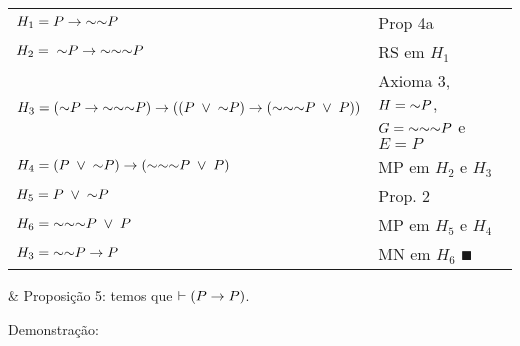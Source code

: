 \begin{tabular}{p{}p{}}
  \hline
    $H_1 = P \rightarrow \mathord{\sim}\mathord{\sim} P$                                  & Prop 4a \\
    $H_2 = \;\mathord{\sim} P \rightarrow \mathord{\sim}\mathord{\sim}\mathord{\sim} P$                       & RS em $H_1$ \\
    $H_3 = (\mathord{\sim} P \rightarrow \mathord{\sim}\mathord{\sim}\mathord{\sim} P) \rightarrow ( (P \;\lor\; \mathord{\sim} P) \rightarrow (\mathord{\sim}\mathord{\sim}\mathord{\sim} P \;\lor\; P) )$       & Axioma 3, $H = \mathord{\sim} P$, $G = \mathord{\sim}\mathord{\sim}\mathord{\sim} P$ e $E = P$ \\
    $H_4 = (P \;\lor\; \mathord{\sim} P) \rightarrow (\mathord{\sim}\mathord{\sim}\mathord{\sim} P \;\lor\; P)$         & MP em $H_2$ e $H_3$ \\
    $H_5 = P \;\lor\; \mathord{\sim} P$                                       & Prop. 2 \\
    $H_6 = \mathord{\sim}\mathord{\sim}\mathord{\sim} P \;\lor\; P$                               & MP em $H_5$ e $H_4$ \\
    $H_3 = \mathord{\sim}\mathord{\sim} P \rightarrow P$                                  & MN em $H_6$ $\QED$ \\
  \hline
\end{tabular}

\SKIP
  
\begin{easylist}

  & Proposição 5: temos que $\vdash (P \rightarrow P)$.

\end{easylist}

\SKIP

Demonstração:

